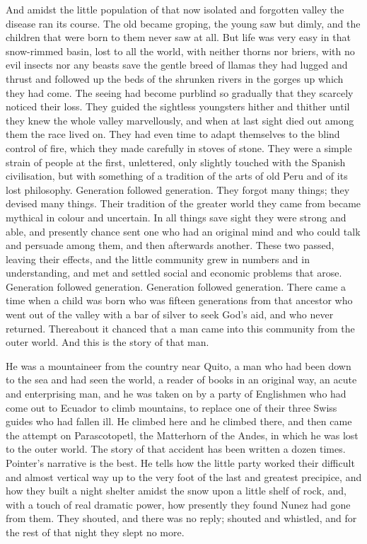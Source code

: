 \documentclass[submission]{sffms}
\begin{document}
And amidst the little population of that now isolated and forgotten
valley the disease ran its course. The old became groping, the young
saw but dimly, and the children that were born to them never saw at
all. But life was very easy in that snow-rimmed basin, lost to all the
world, with neither thorns nor briers, with no evil insects nor any
beasts save the gentle breed of llamas they had lugged and thrust and
followed up the beds of the shrunken rivers in the gorges up which
they had come. The seeing had become purblind so gradually that they
scarcely noticed their loss. They guided the sightless youngsters
hither and thither until they knew the whole valley marvellously, and
when at last sight died out among them the race lived on. They had
even time to adapt themselves to the blind control of fire, which they
made carefully in stoves of stone. They were a simple strain of people
at the first, unlettered, only slightly touched with the Spanish
civilisation, but with something of a tradition of the arts of old
Peru and of its lost philosophy. Generation followed generation. They
forgot many things; they devised many things. Their tradition of the
greater world they came from became mythical in colour and
uncertain. In all things save sight they were strong and able, and
presently chance sent one who had an original mind and who could talk
and persuade among them, and then afterwards another. These two
passed, leaving their effects, and the little community grew in
numbers and in understanding, and met and settled social and economic
problems that arose.  Generation followed generation. Generation
followed generation. There came a time when a child was born who was
fifteen generations from that ancestor who went out of the valley with
a bar of silver to seek God's aid, and who never returned. Thereabout
it chanced that a man came into this community from the outer
world. And this is the story of that man.

He was a mountaineer from the country near Quito, a man who had been
down to the sea and had seen the world, a reader of books in an
original way, an acute and enterprising man, and he was taken on by a
party of Englishmen who had come out to Ecuador to climb mountains, to
replace one of their three Swiss guides who had fallen ill. He climbed
here and he climbed there, and then came the attempt on Parascotopetl,
the Matterhorn of the Andes, in which he was lost to the outer
world. The story of that accident has been written a dozen
times. Pointer's narrative is the best. He tells how the little party
worked their difficult and almost vertical way up to the very foot of
the last and greatest precipice, and how they built a night shelter
amidst the snow upon a little shelf of rock, and, with a touch of real
dramatic power, how presently they found Nunez had gone from
them. They shouted, and there was no reply; shouted and whistled, and
for the rest of that night they slept no more.
\end{document}
